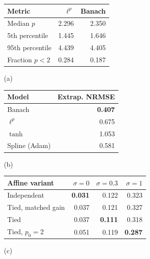 \begin{minipage}[t]{.56\linewidth}\vspace{0pt}\centering
\begin{tabular}{lrr}
\toprule
Metric & $\ell^p$ & Banach \\
\midrule
Median $p$ & 2.296 & 2.350 \\
5th percentile & 1.445 & 1.646 \\
95th percentile & 4.439 & 4.405 \\
Fraction $p<2$ & 0.284 & 0.187 \\
\bottomrule\end{tabular}\par\smallskip (a)\end{minipage}\hfill
\begin{minipage}[t]{.38\linewidth}\vspace{0pt}\centering
\begin{tabular}{lr}
\toprule
Model & Extrap. NRMSE \\
\midrule
Banach & \textbf{0.407} \\
$\ell^p$ & 0.675 \\
$\tanh$ & 1.053 \\
Spline (Adam) & 0.581 \\
\bottomrule\end{tabular}\par\smallskip (b)\end{minipage}\par\medskip
\begin{tabular}{lrrr}
\toprule
Affine variant & $\sigma=0$ & $\sigma=0.3$ & $\sigma=1$ \\
\midrule
Independent & \textbf{0.031} & 0.122 & 0.323 \\
Tied, matched gain & 0.037 & 0.121 & 0.327 \\
Tied & 0.037 & \textbf{0.111} & 0.318 \\
Tied, $p_0=2$ & 0.051 & 0.119 & \textbf{0.287} \\
\bottomrule\end{tabular}
\par\smallskip (c)
